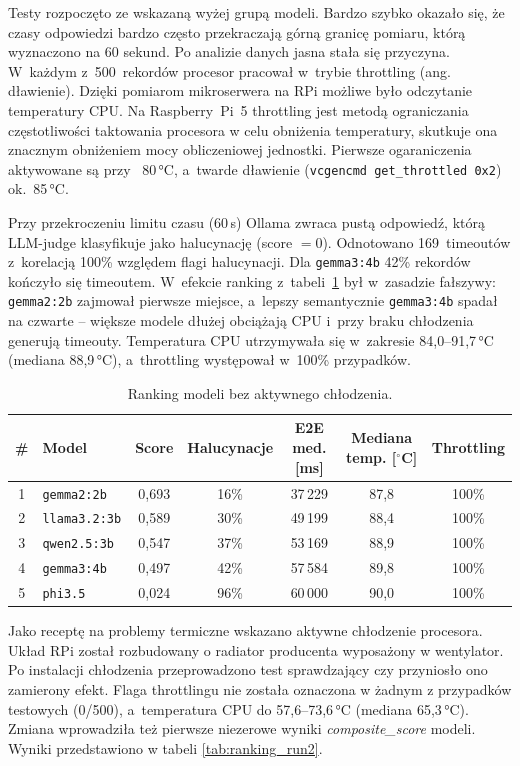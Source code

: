 Testy rozpoczęto ze wskazaną wyżej grupą modeli. Bardzo szybko okazało się, że czasy odpowiedzi bardzo często przekraczają górną granicę pomiaru, którą wyznaczono na 60 sekund. Po analizie danych jasna stała się przyczyna.
W~każdym z~500~rekordów procesor pracował
w~trybie throttling (ang. dławienie). Dzięki pomiarom mikroserwera na RPi możliwe było odczytanie temperatury CPU.
Na Raspberry~Pi~5 throttling jest metodą ograniczania częstotliwości taktowania procesora w celu obniżenia temperatury, skutkuje ona znacznym obniżeniem mocy obliczeniowej jednostki. Pierwsze ogaraniczenia aktywowane są przy ~80\,°C, a~twarde
dławienie (\texttt{vcgencmd get\_throttled 0x2}) ok.~85\,°C.

Przy przekroczeniu limitu czasu (60\,s) Ollama zwraca pustą odpowiedź, którą
LLM-judge klasyfikuje jako halucynację (score $= 0$). Odnotowano 169~timeoutów
z~korelacją 100\% względem flagi halucynacji. Dla \texttt{gemma3:4b} 42\%
rekordów kończyło się timeoutem. W~efekcie ranking z~tabeli~\ref{tab:ranking_run1}
był w~zasadzie fałszywy: \texttt{gemma2:2b} zajmował pierwsze miejsce, a~lepszy
semantycznie \texttt{gemma3:4b} spadał na czwarte -- większe modele dłużej
obciążają CPU i~przy braku chłodzenia generują timeouty. Temperatura CPU
utrzymywała się w~zakresie 84{,}0--91{,}7\,°C (mediana 88{,}9\,°C), a~throttling
występował w~100\% przypadków.

\begin{table}[H]
  \centering
  \caption{Ranking modeli bez aktywnego chłodzenia.}
  \label{tab:ranking_run1}
  \begin{tabular}{clccccc}
    \hline
    \# & Model & Score & Halucynacje & E2E med. [ms] & Mediana temp. [$^\circ$C] & Throttling \\
    \hline
    1 & \texttt{gemma2:2b}  & 0{,}693 & 16\% & 37\,229 & 87{,}8 & 100\% \\
    2 & \texttt{llama3.2:3b}& 0{,}589 & 30\% & 49\,199 & 88{,}4 & 100\% \\
    3 & \texttt{qwen2.5:3b} & 0{,}547 & 37\% & 53\,169 & 88{,}9 & 100\% \\
    4 & \texttt{gemma3:4b}  & 0{,}497 & 42\% & 57\,584 & 89{,}8 & 100\% \\
    5 & \texttt{phi3.5}     & 0{,}024 & 96\% & 60\,000 & 90{,}0 & 100\% \\
    \hline
  \end{tabular}
\end{table}

Jako receptę na problemy termiczne wskazano aktywne chłodzenie procesora. Układ RPi został rozbudowany o radiator producenta wyposażony w wentylator. Po instalacji chłodzenia przeprowadzono test sprawdzający czy przyniosło ono zamierony efekt. Flaga throttlingu nie została oznaczona w żadnym z przypadków testowych (0/500), a~temperatura CPU do 57{,}6--73{,}6\,°C (mediana 65{,}3\,°C). Zmiana wprowadziła też pierwsze niezerowe wyniki \emph{composite\_score} modeli. Wyniki przedstawiono w tabeli \ref{tab:ranking_run2}.

